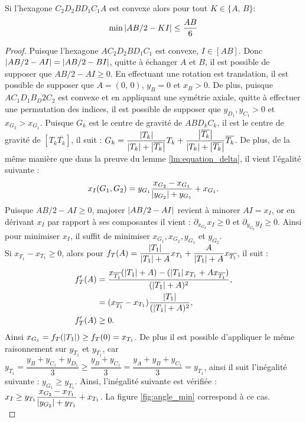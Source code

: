 \documentclass[12pt,a4paper]{article}
\begin{document}
	\begin{lm}\label{lm:majorer_delta_quadrangle}
		Si l'hexagone $C_2D_2BD_1C_1A$ est convexe alors pour tout $K \in \{A,\,B\}$:
		\begin{equation}
			\min \left\lvert AB/2-KI \right\rvert \leq \dfrac{AB}6
		\end{equation}
	\end{lm}
	\begin{proof}
		Puisque l'hexagone $AC_2D_2BD_1C_1$ est convexe, $I \in [AB]$. Donc $\left\lvert AB/2-AI \right\rvert = \left\lvert AB/2-BI \right\rvert$, quitte à échanger $A$ et $B$, il est possible de supposer que $AB/2-AI \geq 0$.	En effectuant une rotation est translation, il est possible de supposer que $A = (0,\,0)$, $y_B =0$ et $x_B > 0$. De plus, puisque $AC_1D_1B_D2C_2$ est convexe et en appliquant une symétrie axiale, quitte à effectuer une permutation des indices, il est possible de supposer que $y_{D_1},y_{C_1} > 0$ et $x_{G_2} > x_{G_1}$. Puisque $G_k$ est le centre de gravité de $ABD_kC_k$, il est le centre de gravité de $[T_k\overline{T_k}]$, il suit : $G_k = \dfrac{\left\lvert T_k \right\rvert}{\left\lvert T_k \right\rvert+\left\lvert \overline{T_k} \right\rvert}T_k + \dfrac{\left\lvert \overline{T_k} \right\rvert}{\left\lvert T_k \right\rvert+\left\lvert \overline{T_k} \right\rvert}\overline{T_k}$. De plus,  de la même manière que dans la preuve du lemme \ref{lm:equation_delta}, il vient l'égalité suivante :
		\[
			x_I(G_1,G_2) = y_{G_1}\dfrac{x_{G_2}-x_{G_1}}{\left\lvert y_{G_2} \right\rvert+y_{G_1}} + x_{G_1}.
		\]
		Puisque $AB/2 - AI \geq 0$, majorer $\left\lvert AB/2-AI \right\rvert$ revient à minorer $AI = x_I$, or en dérivant $x_I$ par rapport à ses composantes il vient : $\partial_{x_{G_k}} x_I \geq 0$ et $\partial_{y_{G_k}} y_I \geq 0$. Ainsi pour minimiser $x_I$, il suffit de minimiser $x_{G_1},x_{G_2},y_{G_1}$ et $y_{G_2}$.\\
		Si $x_{\overline{T_1}} - x_{T_1} \geq 0$, alors pour $f_T(A) = \dfrac{\left\lvert T_1 \right\rvert}{\left\lvert T_1 \right\rvert+A}x_{T_1} + \dfrac{A}{\left\lvert T_1 \right\rvert+A}x_{\overline{T_1}}$, il suit : 
		\[
		\begin{aligned}
			f_T'(A) &= \dfrac{x_{\overline{T_1}}(\left\lvert T_1 \right\rvert+A)-(\left\lvert T_1 \right\rvert x_{T_1}+Ax_{\overline{T_1}})}{(\left\lvert T_1 \right\rvert+A)^2},\\
			&= (x_{\overline{T_1}}-x_{T_1})\dfrac{\left\lvert T_1 \right\rvert}{(\left\lvert T_1 \right\rvert+A)^2},\\
			f_T'(A)&\geq 0.
		\end{aligned}
		\]
		Ainsi $x_{G_1} = f_T(\left\lvert T_1 \right\rvert) \geq f_T(0) = x_{T_1}$. De plus il est possible d'appliquer le même raisonnement sur $y_{T_1}$ et $y_{\overline{T_1}}$, car $y_{\overline{T_1}} = \dfrac{y_B+y_{C_1}+y_{D_1}}3 \geq \dfrac{y_B+y_{C_1}}3 = \dfrac{y_A+y_B+y_{C_1}}3 = y_{T_1}$, ainsi il suit l'inégalité suivante : $y_{G_1} \geq y_{T_1}$. Ainsi, l'inégalité suivante est vérifiée : $x_I \geq y_{T_1}\dfrac{x_{G_2}-x_{T_1}}{\left\lvert y_{G_2} \right\rvert+y_{T_1}}+x_{T_1}$. La figure \ref{fig:angle_min} correspond à ce cas.\\

\end{proof}
\end{document}
